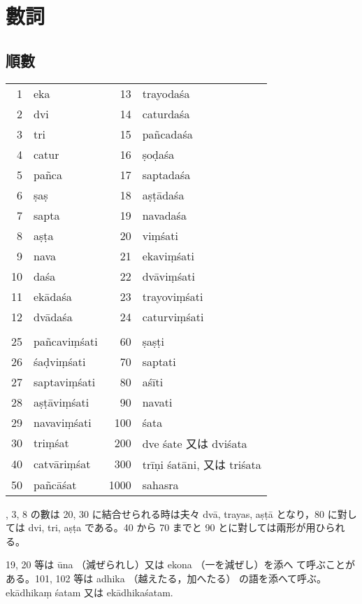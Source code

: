 \section{數詞}
\subsection{順數}
\numberParagraph
\begin{longtable}{rlrl}
 1 & eka     & 13 & trayodaśa \\
 2 & dvi     & 14 & caturdaśa \\
 3 & tri     & 15 & pañcadaśa \\
 4 & catur   & 16 & ṣoḍaśa \\
 5 & pañca   & 17 & saptadaśa \\
 6 & ṣaṣ     & 18 & aṣṭādaśa \\
 7 & sapta   & 19 & navadaśa\footnotemark \\
 8 & aṣṭa    & 20 & viṃśati \\
 9 & nava    & 21 & ekaviṃśati \\
10 & daśa    & 22 & dvāviṃśati \\
11 & ekādaśa & 23 & trayoviṃśati \\
12 & dvādaśa & 24 & caturviṃśati \\
\\
25 & pañcaviṃśati              &   60 & ṣaṣṭi \\
26 & śaḍviṃśati                &   70 & saptati \\
27 & saptaviṃśati              &   80 & aśīti \\
28 & aṣṭāviṃśati               &   90 & navati \\
29 & navaviṃśati\footnotemark  &  100 & śata \\
30 & triṃśat                   &  200 & dve śate 又は dviśata\\
40 & catvāriṃśat               &  300 & trīṇi śatāni, 又は triśata \\
50 & pañcāśat                  & 1000 & sahasra \\
\end{longtable}
\addtocounter{footnote}{-2}

, 3, 8 の數は 20, 30 に結合せられる時は夫々 dvā,
trayas, aṣṭā となり，80 に對しては dvi, tri, aṣṭa である。40
から 70 までと 90 とに對しては兩形が用ひられる。

19, 20 等は ūna （減ぜられし）又は ekona （一を減ぜし）を添へ
て呼ぶことがある。101, 102 等は adhika （越えたる，加へたる）
の語を添へて呼ぶ。ekādhikaṃ śatam 又は ekādhikaśatam.

